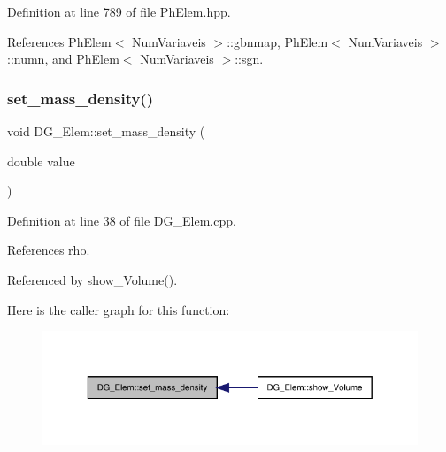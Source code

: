 Definition at line 789 of file Ph\+Elem.\+hpp.



References Ph\+Elem$<$ Num\+Variaveis $>$\+::gbnmap, Ph\+Elem$<$ Num\+Variaveis $>$\+::numn, and Ph\+Elem$<$ Num\+Variaveis $>$\+::sgn.

\mbox{\label{classDG__Elem_a132e9ad800e701395b1e21d291040ff2}} 
\subsubsection{\texorpdfstring{set\+\_\+mass\+\_\+density()}{set\_mass\_density()}}
{\footnotesize\ttfamily void D\+G\+\_\+\+Elem\+::set\+\_\+mass\+\_\+density (\begin{DoxyParamCaption}\item[{double}]{value }\end{DoxyParamCaption})}



Definition at line 38 of file D\+G\+\_\+\+Elem.\+cpp.



References rho.



Referenced by show\+\_\+\+Volume().

Here is the caller graph for this function\+:
\nopagebreak
\begin{figure}[H]
\begin{center}
\leavevmode
\includegraphics[width=329pt]{classDG__Elem_a132e9ad800e701395b1e21d291040ff2_icgraph}
\end{center}
\end{figure}
\mbox{\label{classPhElem_a24a705e62f179fa36c6886f8f0a3ef25}} 
